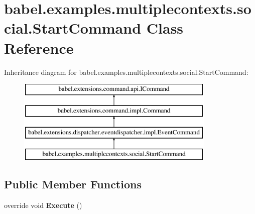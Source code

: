 \hypertarget{classbabel_1_1examples_1_1multiplecontexts_1_1social_1_1_start_command}{\section{babel.\-examples.\-multiplecontexts.\-social.\-Start\-Command Class Reference}
\label{classbabel_1_1examples_1_1multiplecontexts_1_1social_1_1_start_command}
}
Inheritance diagram for babel.\-examples.\-multiplecontexts.\-social.\-Start\-Command\-:\begin{figure}[H]
\begin{center}
\leavevmode
\includegraphics[height=4.000000cm]{classbabel_1_1examples_1_1multiplecontexts_1_1social_1_1_start_command}
\end{center}
\end{figure}
\subsection*{Public Member Functions}
\begin{DoxyCompactItemize}
\item 
\hypertarget{classbabel_1_1examples_1_1multiplecontexts_1_1social_1_1_start_command_a2a907a7dd92154a56ae4417cc7ef51b8}{override void {\bfseries Execute} ()}\label{classbabel_1_1examples_1_1multiplecontexts_1_1social_1_1_start_command_a2a907a7dd92154a56ae4417cc7ef51b8}

\end{DoxyCompactItemize}
